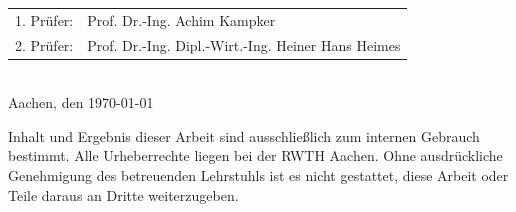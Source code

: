 \begin{titlepage}
	\begin{tabularx}{\linewidth}{p{2cm}X}
		\rule[-2ex]{0pt}{2.5ex} 1. Prüfer: & Prof. Dr.-Ing. Achim Kampker \\ 
		\rule[-2ex]{0pt}{2.5ex} 2. Prüfer: & Prof. Dr.-Ing. Dipl.-Wirt.-Ing. Heiner Hans Heimes \\ 
	\end{tabularx} 
	\\
	\vspace{1.2cm}
	\hspace{0.15cm}
	Aachen, den \today
	\\
	\vspace{1.4cm}
	\hspace{0.15cm}
	\begin{minipage}{0.98\textwidth}
		\large
		Inhalt und Ergebnis dieser Arbeit sind ausschließlich zum internen Gebrauch\\ bestimmt. Alle Urheberrechte liegen bei der RWTH Aachen. Ohne ausdrückliche\\ Genehmigung des betreuenden Lehrstuhls ist es nicht gestattet, diese Arbeit oder Teile daraus an Dritte weiterzugeben.
	\end{minipage}

\end{titlepage}	

\newpage

	\thispagestyle{empty} %
	\mbox{}

\newpage